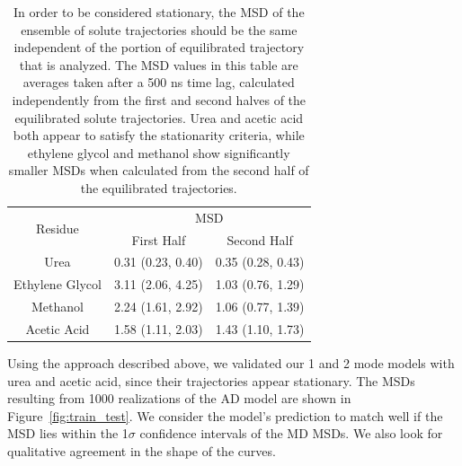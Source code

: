 \documentclass{article}
\begin{document}
  \begin{table}[h]
  \centering
  \begin{tabular}{|c|c|c|}
  \hline
  \multirow{2}{*}{Residue} & \multicolumn{2}{c|}{MSD}            \\\cline{2-3}
                           & First Half       & Second Half      \\\hline
  Urea                     & 0.31 (0.23, 0.40)& 0.35 (0.28, 0.43)\\\hline
  Ethylene Glycol          & 3.11 (2.06, 4.25)& 1.03 (0.76, 1.29)\\\hline
  Methanol                 & 2.24 (1.61, 2.92)& 1.06 (0.77, 1.39)\\\hline
  Acetic Acid              & 1.58 (1.11, 2.03)& 1.43 (1.10, 1.73)\\\hline

  \end{tabular}
  \caption{In order to be considered stationary, the MSD of the ensemble of solute trajectories
  should be the same independent of the portion of equilibrated trajectory that is
  analyzed. The MSD values in this table are averages taken after a 500 ns time lag, 
  calculated independently from the first and second halves of the equilibrated
  solute trajectories. Urea and acetic acid both appear to satisfy the stationarity
  criteria, while ethylene glycol and methanol show significantly smaller MSDs 
  when calculated from the second half of the equilibrated trajectories.}\label{table:stationarity}
  \end{table}
  

  Using the approach described above, we validated our 1 and 2 mode models with
  urea and acetic acid, since their trajectories appear stationary. 
  The MSDs resulting from 1000 realizations of the AD model are shown in 
  Figure~\ref{fig:train_test}. We consider the model's prediction to match well if the
  MSD lies within the 1$\sigma$ confidence intervals of the MD MSDs. We also
  look for qualitative agreement in the shape of the curves.
  
\end{document}
